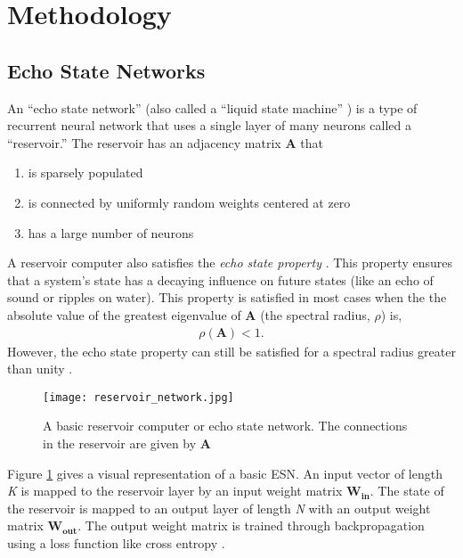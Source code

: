 \section{Methodology}

\subsection{\textbf{Echo State Networks}}
An ``echo state network'' (also
called a ``liquid state machine'' \cite{lukosevicius_practical_2012}) is a type
of recurrent neural network that uses a single layer of many neurons called a
``reservoir.'' The reservoir has an adjacency matrix $\bm{A}$ that
\begin{enumerate}
	\item is sparsely populated
	\item is connected by uniformly random weights centered at zero
	\item has a large number of neurons
\end{enumerate}
A reservoir computer also satisfies the \textit{echo state property}
\cite{pathak_model-free_2018, lukosevicius_reservoir_2009}. This
property ensures that a system's state has a decaying influence on future states
(like an echo of sound or ripples on water). This property is satisfied in most
cases when the the absolute value of the greatest eigenvalue of
$\bm{A}$ (the spectral radius, $\rho$) \cite{lukosevicius_reservoir_2009} is,
\begin{align}
	\rho(\bm{A}) < 1.
\end{align}
However, the echo state property can still be satisfied for a spectral radius
greater than unity \cite{lukosevicius_practical_2012}.

\begin{figure}[H]
	\texttt{[image: reservoir\_network.jpg]}
	\caption{A basic reservoir computer or echo state network. The connections in
	the reservoir are given by $\bm{A}$}
	\label{fig:RCmodel}
\end{figure}

Figure \ref{fig:RCmodel} gives a visual representation of a basic
\acrshort{ESN}. An
input vector of length \textit{K} is mapped to the reservoir layer by an input
weight matrix $\bm{W_{in}}$. The state of the reservoir is mapped to an output
layer of length \textit{N} with an output weight matrix $\bm{W_{out}}$.
The output weight matrix is trained through
backpropagation using a loss function like cross entropy
\cite{pathak_model-free_2018, vlachas_backpropagation_2020}.

